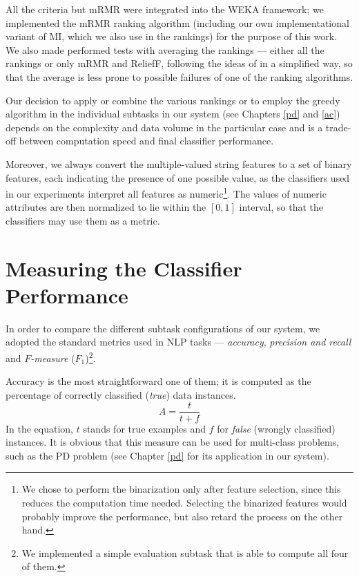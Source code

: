 \documentclass[12pt,notitlepage]{report}
\begin{document}
All the criteria but mRMR were integrated into the WEKA framework; we implemented the mRMR ranking algorithm (including our own implementational variant of MI, which we also use in the rankings) for the purpose of this work. We also made performed tests with averaging the rankings --- either all the rankings or only mRMR and ReliefF, following the ideas of \citet{zhang08} in a simplified way, so that the average is less prone to possible failures of one of the ranking algorithms.

Our decision to apply or combine the various rankings or to employ the greedy algorithm in the individual subtasks in our system (see Chapters \ref{pd} and \ref{ac}) depends on the complexity and data volume in the particular case and is a trade-off between computation speed and final classifier performance.

Moreover, we always convert the multiple-valued string features to a set of binary features, each indicating the presence of one possible value, as the classifiers used in our experiments interpret all features as numeric\footnote{We chose to perform the binarization only after feature selection, since this reduces the computation time needed. Selecting the binarized features would probably improve the performance, but also retard the process on the other hand.}. The values of numeric attributes are then normalized \citep[p. 56f.]{witten05} to lie within the $[0,1]$ interval, so that the classifiers may use them as a metric.

\section{Measuring the Classifier Performance}\label{metrics}

In order to compare the different subtask configurations of our system, we adopted the standard metrics used in NLP tasks \citep[p. 268ff., p. 142ff., p. 171ff., respectively]{manning00,manning08,witten05} --- \emph{accuracy}, \emph{precision and recall}  and \emph{$F$-measure} ($F_1$)\footnote{We implemented a simple evaluation subtask that is able to compute all four of them.}. 

Accuracy is the most straightforward one of them; it is computed as the percentage of correctly classified (\emph{true}) data instances.
\begin{equation}
A = \frac{t}{t + f}
\end{equation}
In the equation, $t$ stands for true examples and $f$ for \emph{false} (wrongly classified) instances. It is obvious that this measure can be used for multi-class problems, such as the PD problem (see Chapter \ref{pd} for its application in our system).
\end{document}
